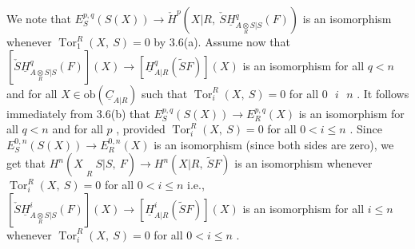 \begin{center}
\end{center}


We note that  $E^{p,q}_{S}(S(X)) \to \check{H}^{p}(X|R,\ \check{S}\underline{H}^{q}_{A\underset{R}{\otimes}S|S}(F))$  is an isomorphism whenever $\operatorname{Tor}^{R}_{1}(X,\ S) = 0$  by 3.6(a). Assume now that $[\check{S}\underline{H}^{q}_{A\underset{R}{\otimes}S|S}(F)](X) \to [\underline{H}^{q}_{A|R}(\widetilde{S}F)](X)$  is an isomorphism for all  $q < n$  and for all $X \in \mathrm{ob}(\underline{C}_{A|R})$  such that  $\operatorname{Tor}^{R}_{i}(X,\ S) = 0$  for all  $0\ \ \ i\ \ \ n$ . It follows immediately from 3.6(b) that  $E^{p,q}_{S}(S(X)) \to E^{p,q}_{R}(X)$  is an isomorphism for all  $q < n$ and for all  $p$ , provided  $\operatorname{Tor}^{R}_{i}(X,\ S) = 0$  for all  $0 < i \leq n$ . Since $E^{0,n}_{S}(S(X)) \to E^{0,n}_{R}(X)$  is an isomorphism (since both sides are zero), we get that $H^{n}(X\underset{R}{\phantom{\otimes}}S|S,\ F) \to H^{n}(X|R,\ \widetilde{S}F)$  is an isomorphism whenever  $\operatorname{Tor}^{R}_{i}(X,\ S) = 0$  for all $0 < i \leq n$  i.e.,  $[\check{S}\underline{H}^{i}_{A\underset{R}{\otimes}S|S}(F)](X) \to [\underline{H}^{i}_{A|R}(\widetilde{S}F)](X)$  is an isomorphism for all $i \leq n$  whenever  $\operatorname{Tor}^{R}_{i}(X,\ S) = 0$  for all  $0 < i \leq n$ .


